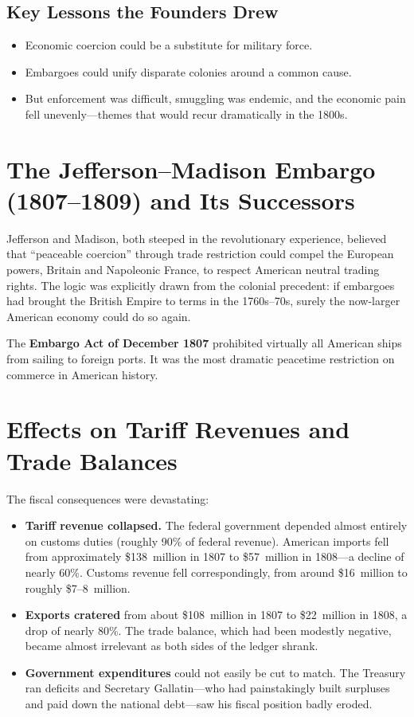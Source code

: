 \documentclass[12pt]{article}
\begin{document}
\subsection{Key Lessons the Founders Drew}

\begin{itemize}[nosep]
    \item Economic coercion could be a substitute for military force.
    \item Embargoes could unify disparate colonies around a common cause.
    \item But enforcement was difficult, smuggling was endemic, and the economic
          pain fell unevenly---themes that would recur dramatically in the 1800s.
\end{itemize}

\section{The Jefferson--Madison Embargo (1807--1809) and Its Successors}

Jefferson and Madison, both steeped in the revolutionary experience, believed
that ``peaceable coercion'' through trade restriction could compel the European
powers, Britain and Napoleonic France, to respect American neutral trading
rights. The logic was explicitly drawn from the colonial precedent: if embargoes
had brought the British Empire to terms in the 1760s--70s, surely the
now-larger American economy could do so again.

The \textbf{Embargo Act of December 1807} prohibited virtually all American
ships from sailing to foreign ports. It was the most dramatic peacetime
restriction on commerce in American history.

\section{Effects on Tariff Revenues and Trade Balances}

The fiscal consequences were devastating:

\begin{itemize}
    \item \textbf{Tariff revenue collapsed.} The federal government depended
    almost entirely on customs duties (roughly 90\% of federal revenue).
    American imports fell from approximately \$138~million in 1807 to
    \$57~million in 1808---a decline of nearly 60\%. Customs revenue fell
    correspondingly, from around \$16~million to roughly \$7--8~million.

    \item \textbf{Exports cratered} from about \$108~million in 1807 to
    \$22~million in 1808, a drop of nearly 80\%. The trade balance, which had
    been modestly negative, became almost irrelevant as both sides of the ledger
    shrank.

    \item \textbf{Government expenditures} could not easily be cut to match.
    The Treasury ran deficits and Secretary Gallatin---who had painstakingly
    built surpluses and paid down the national debt---saw his fiscal position
    badly eroded.
\end{itemize}
\end{document}
